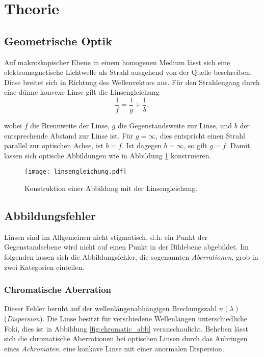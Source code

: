 


\newpage
\section{Theorie}
\subsection{Geometrische Optik}
Auf makroskopischer Ebene in einem homogenen Medium lässt sich eine elektromagnetische Lichtwelle als Strahl ausgehend von der Quelle beschreiben. Diese breitet sich in Richtung des Wellenvektors aus. Für den Strahlengang durch eine dünne konvexe Linse gilt die Linsengleichung
\begin{equation}
\frac{1}{f}=\frac{1}{g}+\frac{1}{b},
\label{eq:abb_gleichung}
\end{equation}

wobei $f$ die Brennweite der Linse, $g$ die Gegenstandsweite zur Linse, und $b$ der entsprechende Abstand zur Linse ist. Für $g=\infty$, dies entspricht einen Strahl parallel zur optischen Achse, ist $b=f$. Ist dagegen $b=\infty$, so gilt $g=f$. Damit lassen sich optische Abbildungen wie in Abbildung \ref{fig:geo_optik} konstruieren.

\begin{figure}[h]
	\centering
	\texttt{[image: linsengleichung.pdf]}
	\caption{Konstruktion einer Abbildung mit der Linsengleichung.}
	\label{fig:geo_optik}
\end{figure}

\newpage
\enlargethispage{3em}
\subsection{Abbildungsfehler}
Linsen sind im Allgemeinen nicht stigmatisch, d.h. ein Punkt der Gegenstandsebene wird nicht auf einen Punkt in der Bildebene abgebildet. Im folgenden lassen sich die Abbildungsfehler, die sogenannten \emph{Aberrationen}, grob in zwei Kategorien einteilen.

\subsubsection{Chromatische Aberration}		\vspace{-1ex}
Dieser Fehler beruht auf der wellenlängenabhängigen Brechungszahl $n(\lambda)$ (\emph{Dispersion}). Die Linse besitzt für verschiedene Wellenlängen unterschiedliche Foki, dies ist in Abbildung \ref{fig:chromatic_abb} veranschaulicht.
Beheben lässt sich die chromatische Aberrationen bei optischen Linsen durch das Anbringen eines \emph{Achromaten}, eine konkave Linse mit einer anormalen Dispersion.

